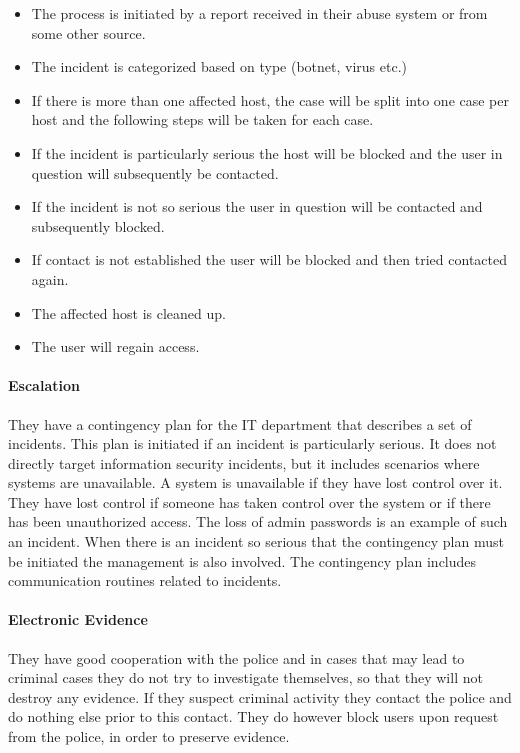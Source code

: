\begin{itemize}\itemsep-0.2cm
\item The process is initiated by a report received in their abuse system or from some other source. 
\item The incident is categorized based on type (botnet, virus etc.)
\item If there is more than one affected host, the case will be split into one case per host and the following steps will be taken for each case.
\item If the incident is particularly serious the host will be blocked and the user in question will subsequently be contacted.
\item If the incident is not so serious the user in question will be contacted and subsequently blocked.
\item If contact is not established the user will be blocked and then tried contacted again.
\item The affected host is cleaned up.
\item The user will regain access.
\end{itemize}

\paragraph{Escalation}
They have a contingency plan for the IT department that describes a set of incidents. This plan is initiated if an incident is particularly serious. It does not directly target information security incidents, but it includes scenarios where systems are unavailable. A system is unavailable if they have lost control over it. They have lost control if someone has taken control over the system or if there has been unauthorized access. The loss of admin passwords is an example of such an incident. When there is an incident so serious that the contingency plan must be initiated the management is also involved. The contingency plan includes communication routines related to incidents. 

\paragraph{Electronic Evidence}
They have good cooperation with the police and in cases that may lead to criminal cases they do not try to investigate themselves, so that they will not destroy any evidence. If they suspect criminal activity they contact the police and do nothing else prior to this contact. They do however block users upon request from the police, in order to preserve evidence.

